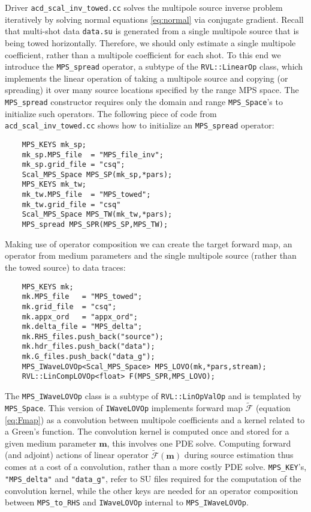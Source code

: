 Driver {\tt acd\_scal\_inv\_towed.cc} solves the multipole source inverse problem iteratively by solving normal equations \ref{eq:normal} via conjugate gradient.
Recall that multi-shot data {\tt data.su} is generated from a single multipole source that is being towed horizontally.
Therefore, we should only estimate a single multipole coefficient, rather than a multipole coefficient for each shot.
To this end we introduce the {\tt MPS\_spread} operator, a subtype of the {\tt RVL::LinearOp} class, which implements the linear operation of taking a multipole source and copying (or spreading) it over many source locations specified by the range MPS space.
The {\tt MPS\_spread} constructor requires only the domain and range {\tt MPS\_Space}'s to initialize such operators.
The following piece of code from {\tt acd\_scal\_inv\_towed.cc} shows how to initialize an {\tt MPS\_spread} operator:
{\small
\begin{verbatim}
    MPS_KEYS mk_sp;
    mk_sp.MPS_file  = "MPS_file_inv";
    mk_sp.grid_file = "csq";
    Scal_MPS_Space MPS_SP(mk_sp,*pars);
    MPS_KEYS mk_tw;
    mk_tw.MPS_file  = "MPS_towed";
    mk_tw.grid_file = "csq"
    Scal_MPS_Space MPS_TW(mk_tw,*pars);
    MPS_spread MPS_SPR(MPS_SP,MPS_TW);
\end{verbatim}
}
Making use of operator composition we can create the target forward map, an operator from medium parameters and the single multipole source (rather than the towed source) to data traces:
{\small
\begin{verbatim}
    MPS_KEYS mk;
    mk.MPS_file   = "MPS_towed";
    mk.grid_file  = "csq";
    mk.appx_ord   = "appx_ord";
    mk.delta_file = "MPS_delta";
    mk.RHS_files.push_back("source");
    mk.hdr_files.push_back("data");
    mk.G_files.push_back("data_g");
    MPS_IWaveLOVOp<Scal_MPS_Space> MPS_LOVO(mk,*pars,stream);
    RVL::LinCompLOVOp<float> F(MPS_SPR,MPS_LOVO);
\end{verbatim}
}
The {\tt MPS\_IWaveLOVOp} class is a subtype of {\tt RVL::LinOpValOp} and is templated by {\tt MPS\_Space}.
This version of {\tt IWaveLOVOp} implements forward map $\tilde{\mathcal F}$ (equation \ref{eq:Fmap}) as a convolution between multipole coefficients and a kernel related to a Green's function.
The convolution kernel is computed once and stored for a given medium parameter $\mathbf m$, this involves one PDE solve.
Computing forward (and adjoint) actions of linear operator $\tilde{\mathcal F}(\mathbf m)$ during source estimation thus comes at a cost of a convolution, rather than a more costly PDE solve.
{\tt MPS\_KEY}'s, {\tt "MPS\_delta"} and {\tt "data\_g"}, refer to SU files required for the computation of the convolution kernel, while the other keys are needed for an operator composition between {\tt MPS\_to\_RHS} and {\tt IWaveLOVOp} internal to {\tt MPS\_IWaveLOVOp}.

